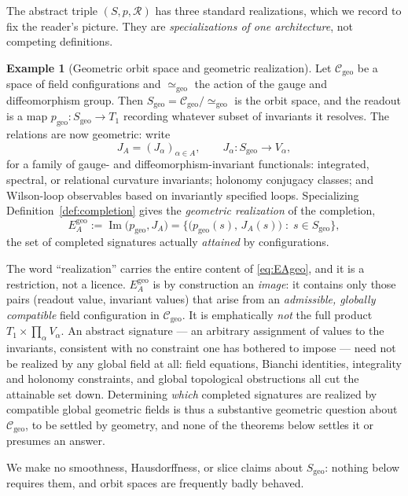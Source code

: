 \documentclass[11pt,reqno]{amsart}
\theoremstyle{plain}
\theoremstyle{definition}
\newtheorem{example}[theorem]{Example}
\theoremstyle{remark}
\DeclareMathOperator{\Ima}{Im}
\begin{document}
The abstract triple $(S,p,\mathcal R)$ has three standard realizations, which we record to fix the reader's picture. They are \emph{specializations of one architecture}, not competing definitions.

\begin{example}[Geometric orbit space and geometric realization]\label{ex:geo}
Let $\mathcal C_{\mathrm{geo}}$ be a space of field configurations and $\simeq_{\mathrm{geo}}$ the action of the gauge and diffeomorphism group. Then $S_{\mathrm{geo}}=\mathcal C_{\mathrm{geo}}/\!\simeq_{\mathrm{geo}}$ is the orbit space, and the readout is a map $p_{\mathrm{geo}}\colon S_{\mathrm{geo}}\to T_1$ recording whatever subset of invariants it resolves. The relations are now geometric: write
\[
J_A=(J_\alpha)_{\alpha\in A},\qquad J_\alpha\colon S_{\mathrm{geo}}\to V_\alpha ,
\]
for a family of gauge- and diffeomorphism-invariant functionals: integrated, spectral, or relational curvature invariants; holonomy conjugacy classes; and Wilson-loop observables based on invariantly specified loops. Specializing Definition~\ref{def:completion} gives the \emph{geometric realization} of the completion,
\begin{equation}\label{eq:EAgeo}
E_A^{\mathrm{geo}}:=\Ima\bigl(p_{\mathrm{geo}},J_A\bigr)
=\bigl\{\bigl(p_{\mathrm{geo}}(s),\,J_A(s)\bigr)\;:\;s\in S_{\mathrm{geo}}\bigr\},
\end{equation}
the set of completed signatures actually \emph{attained} by configurations.

The word ``realization'' carries the entire content of \eqref{eq:EAgeo}, and it is a restriction, not a licence. $E_A^{\mathrm{geo}}$ is by construction an \emph{image}: it contains only those pairs (readout value, invariant values) that arise from an \emph{admissible, globally compatible} field configuration in $\mathcal C_{\mathrm{geo}}$. It is emphatically \emph{not} the full product $T_1\times\prod_\alpha V_\alpha$. An abstract signature --- an arbitrary assignment of values to the invariants, consistent with no constraint one has bothered to impose --- need not be realized by any global field at all: field equations, Bianchi identities, integrality and holonomy constraints, and global topological obstructions all cut the attainable set down. Determining \emph{which} completed signatures are realized by compatible global geometric fields is thus a substantive geometric question about $\mathcal C_{\mathrm{geo}}$, to be settled by geometry, and none of the theorems below settles it or presumes an answer.

We make no smoothness, Hausdorffness, or slice claims about $S_{\mathrm{geo}}$: nothing below requires them, and orbit spaces are frequently badly behaved.
\end{example}
\end{document}
